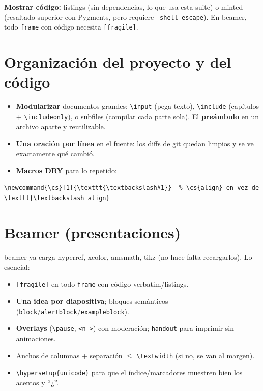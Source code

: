 \documentclass[11pt,a4paper]{article}
\newcommand{\C}[1]{\texttt{\textbackslash #1}}
\newcommand{\pkg}[1]{\textsf{#1}}
\begin{document}
\noindent\textbf{Mostrar código:} \pkg{listings} (sin dependencias, lo que usa
esta suite) o \pkg{minted} (resaltado superior con Pygments, pero requiere
\texttt{-shell-escape}). En \pkg{beamer}, todo \texttt{frame} con código necesita
\texttt{[fragile]}.

\section{Organización del proyecto y del código}
\begin{itemize}[noitemsep,leftmargin=*]
  \item \textbf{Modularizar} documentos grandes: \C{input} (pega texto),
        \C{include} (capítulos + \C{includeonly}), o \pkg{subfiles} (compilar cada
        parte sola). El \textbf{preámbulo} en un archivo aparte y reutilizable.
  \item \textbf{Una oración por línea} en el fuente: los diffs de git quedan
        limpios y se ve exactamente qué cambió.
  \item \textbf{Macros DRY} para lo repetido:
\end{itemize}
\begin{lstlisting}
\newcommand{\cs}[1]{\texttt{\textbackslash#1}}  % \cs{align} en vez de \texttt{\textbackslash align}
\end{lstlisting}

\section{Beamer (presentaciones)}
\pkg{beamer} ya carga \pkg{hyperref}, \pkg{xcolor}, \pkg{amsmath}, \pkg{tikz}
(no hace falta recargarlos). Lo esencial:
\begin{itemize}[noitemsep,leftmargin=*]
  \item \texttt{[fragile]} en todo \texttt{frame} con código verbatim/listings.
  \item \textbf{Una idea por diapositiva}; bloques semánticos
        (\texttt{block}/\texttt{alertblock}/\texttt{exampleblock}).
  \item \textbf{Overlays} (\C{pause}, \texttt{<n->}) con moderación; \texttt{handout}
        para imprimir sin animaciones.
  \item Anchos de columnas + separación \textbf{$\le$} \C{textwidth} (si no, se
        van al margen).
  \item \C{hypersetup\{unicode\}} para que el índice/marcadores muestren bien los
        acentos y \enquote{¿}.
\end{itemize}
\end{document}
